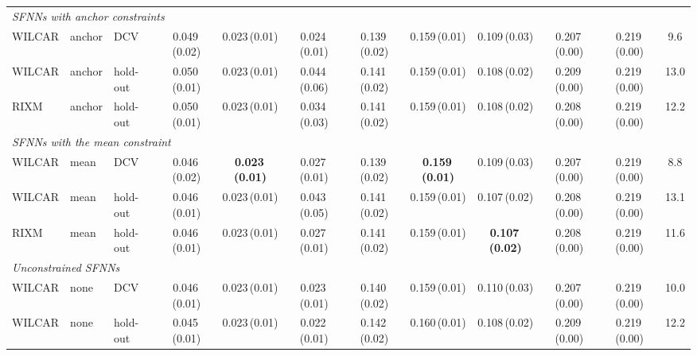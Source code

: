 \begin{table}[!tbp]
{\begin{tabular}{lllccccccccc}
\midrule
\multicolumn{12}{l}{\textit{SFNNs with anchor constraints}} \\
WILCAR & anchor & DCV & 0.049\,{\scriptsize(0.02)} & 0.023\,{\scriptsize(0.01)} & 0.024\,{\scriptsize(0.01)} & 0.139\,{\scriptsize(0.02)} & 0.159\,{\scriptsize(0.01)} & 0.109\,{\scriptsize(0.03)} & 0.207\,{\scriptsize(0.00)} & 0.219\,{\scriptsize(0.00)} & 9.6 \\
WILCAR & anchor & hold-out & 0.050\,{\scriptsize(0.01)} & 0.023\,{\scriptsize(0.01)} & 0.044\,{\scriptsize(0.06)} & 0.141\,{\scriptsize(0.02)} & 0.159\,{\scriptsize(0.01)} & 0.108\,{\scriptsize(0.02)} & 0.209\,{\scriptsize(0.00)} & 0.219\,{\scriptsize(0.00)} & 13.0 \\
RIXM & anchor & hold-out & 0.050\,{\scriptsize(0.01)} & 0.023\,{\scriptsize(0.01)} & 0.034\,{\scriptsize(0.03)} & 0.141\,{\scriptsize(0.02)} & 0.159\,{\scriptsize(0.01)} & 0.108\,{\scriptsize(0.02)} & 0.208\,{\scriptsize(0.00)} & 0.219\,{\scriptsize(0.00)} & 12.2 \\
\midrule
\multicolumn{12}{l}{\textit{SFNNs with the mean constraint}} \\
WILCAR & mean & DCV & 0.046\,{\scriptsize(0.02)} & \textbf{0.023\,{\scriptsize(0.01)}} & 0.027\,{\scriptsize(0.01)} & 0.139\,{\scriptsize(0.02)} & \textbf{0.159\,{\scriptsize(0.01)}} & 0.109\,{\scriptsize(0.03)} & 0.207\,{\scriptsize(0.00)} & 0.219\,{\scriptsize(0.00)} & 8.8 \\
WILCAR & mean & hold-out & 0.046\,{\scriptsize(0.01)} & 0.023\,{\scriptsize(0.01)} & 0.043\,{\scriptsize(0.05)} & 0.141\,{\scriptsize(0.02)} & 0.159\,{\scriptsize(0.01)} & 0.107\,{\scriptsize(0.02)} & 0.208\,{\scriptsize(0.00)} & 0.219\,{\scriptsize(0.00)} & 13.1 \\
RIXM & mean & hold-out & 0.046\,{\scriptsize(0.01)} & 0.023\,{\scriptsize(0.01)} & 0.027\,{\scriptsize(0.01)} & 0.141\,{\scriptsize(0.02)} & 0.159\,{\scriptsize(0.01)} & \textbf{0.107\,{\scriptsize(0.02)}} & 0.208\,{\scriptsize(0.00)} & 0.219\,{\scriptsize(0.00)} & 11.6 \\
\midrule
\multicolumn{12}{l}{\textit{Unconstrained SFNNs}} \\
WILCAR & none & DCV & 0.046\,{\scriptsize(0.01)} & 0.023\,{\scriptsize(0.01)} & 0.023\,{\scriptsize(0.01)} & 0.140\,{\scriptsize(0.02)} & 0.159\,{\scriptsize(0.01)} & 0.110\,{\scriptsize(0.03)} & 0.207\,{\scriptsize(0.00)} & 0.219\,{\scriptsize(0.00)} & 10.0 \\
WILCAR & none & hold-out & 0.045\,{\scriptsize(0.01)} & 0.023\,{\scriptsize(0.01)} & 0.022\,{\scriptsize(0.01)} & 0.142\,{\scriptsize(0.02)} & 0.160\,{\scriptsize(0.01)} & 0.108\,{\scriptsize(0.02)} & 0.209\,{\scriptsize(0.00)} & 0.219\,{\scriptsize(0.00)} & 12.2 \\

\end{tabular}}
\end{table}
